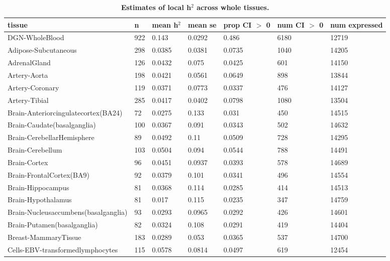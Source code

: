 \documentclass[10pt,letterpaper]{article}
\begin{document}
\begin{table}[!ht]
\begin{adjustwidth}{-2.25in}{0in} %
\caption{
{\bf Estimates of local h$^2$ across whole tissues.}}
\begin{tabular}{lllllll}
  \hline
tissue & n & mean h$^2$ & mean se & prop CI $>$ 0 & num CI $>$ 0 & num expressed \\ 
  \hline
DGN-WholeBlood & 922 & 0.143 & 0.0292 & 0.486 & 6180 & 12719 \\ 
  Adipose-Subcutaneous & 298 & 0.0385 & 0.0381 & 0.0735 & 1040 & 14205 \\ 
  AdrenalGland & 126 & 0.0432 & 0.075 & 0.0425 & 601 & 14150 \\ 
  Artery-Aorta & 198 & 0.0421 & 0.0561 & 0.0649 & 898 & 13844 \\ 
  Artery-Coronary & 119 & 0.0371 & 0.0773 & 0.0337 & 476 & 14127 \\ 
  Artery-Tibial & 285 & 0.0417 & 0.0402 & 0.0798 & 1080 & 13504 \\ 
  Brain-Anteriorcingulatecortex(BA24) & 72 & 0.0275 & 0.133 & 0.031 & 450 & 14515 \\ 
  Brain-Caudate(basalganglia) & 100 & 0.0367 & 0.091 & 0.0343 & 502 & 14632 \\ 
  Brain-CerebellarHemisphere & 89 & 0.0492 & 0.11 & 0.0509 & 728 & 14295 \\ 
  Brain-Cerebellum & 103 & 0.0504 & 0.094 & 0.0544 & 788 & 14491 \\ 
  Brain-Cortex & 96 & 0.0451 & 0.0937 & 0.0393 & 578 & 14689 \\ 
  Brain-FrontalCortex(BA9) & 92 & 0.0379 & 0.101 & 0.0341 & 496 & 14554 \\ 
  Brain-Hippocampus & 81 & 0.0368 & 0.114 & 0.0285 & 414 & 14513 \\ 
  Brain-Hypothalamus & 81 & 0.017 & 0.115 & 0.0235 & 347 & 14759 \\ 
  Brain-Nucleusaccumbens(basalganglia) & 93 & 0.0293 & 0.0965 & 0.0292 & 426 & 14601 \\ 
  Brain-Putamen(basalganglia) & 82 & 0.0324 & 0.108 & 0.0291 & 419 & 14404 \\ 
  Breast-MammaryTissue & 183 & 0.0289 & 0.053 & 0.0365 & 537 & 14700 \\ 
  Cells-EBV-transformedlymphocytes & 115 & 0.0578 & 0.0814 & 0.0497 & 619 & 12454 \\ 

\end{tabular}
\end{adjustwidth}
\end{table}
\end{document}
